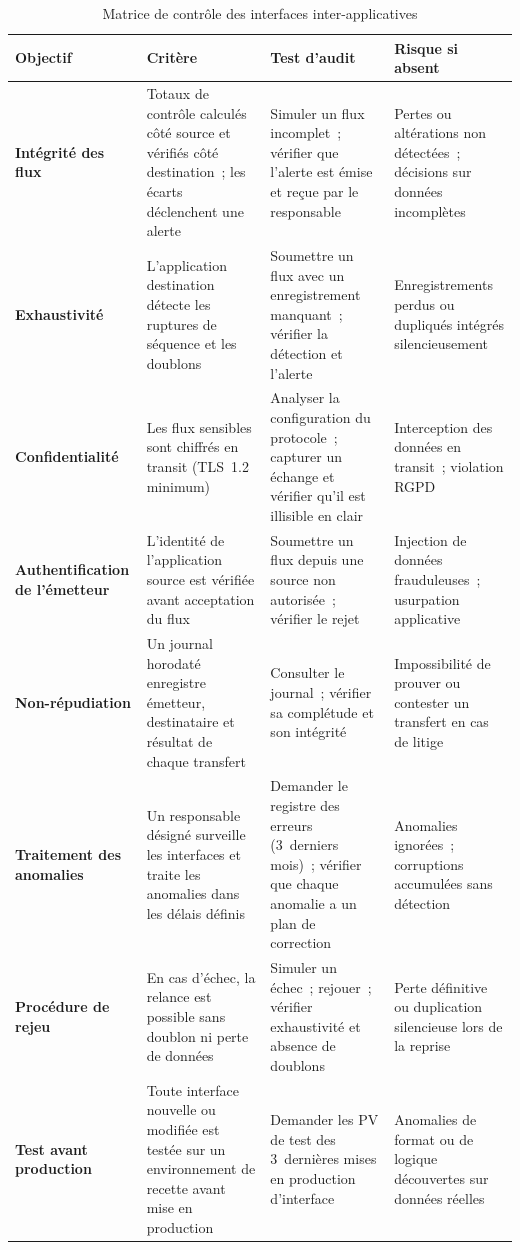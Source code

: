 \begin{table}[H]
\centering
\small
\renewcommand{\arraystretch}{1.5}
\caption{Matrice de contrôle des interfaces inter-applicatives}
\label{tab:controles-interfaces}
\begin{tabular}{|p{2.6cm}|p{3.8cm}|p{3.8cm}|p{2.5cm}|}
    \hline
    \rowcolor{gray!20}
    \textbf{Objectif} & \textbf{Critère} & \textbf{Test d'audit} &
    \textbf{Risque si absent} \\ \hline
    \textbf{Intégrité des flux} &
    Totaux de contrôle calculés côté source et vérifiés côté destination~;
    les écarts déclenchent une alerte &
    Simuler un flux incomplet~; vérifier que l'alerte est émise et reçue
    par le responsable &
    Pertes ou altérations non détectées~; décisions sur données
    incomplètes \\ \hline
    \textbf{Exhaustivité} &
    L'application destination détecte les ruptures de séquence et les
    doublons &
    Soumettre un flux avec un enregistrement manquant~; vérifier la
    détection et l'alerte &
    Enregistrements perdus ou dupliqués intégrés silencieusement \\ \hline
    \textbf{Confidentialité} &
    Les flux sensibles sont chiffrés en transit (TLS~1.2 minimum) &
    Analyser la configuration du protocole~; capturer un échange et
    vérifier qu'il est illisible en clair &
    Interception des données en transit~; violation RGPD \\ \hline
    \textbf{Authentification de l'émetteur} &
    L'identité de l'application source est vérifiée avant acceptation
    du flux &
    Soumettre un flux depuis une source non autorisée~; vérifier le
    rejet &
    Injection de données frauduleuses~; usurpation applicative \\ \hline
    \textbf{Non-répudiation} &
    Un journal horodaté enregistre émetteur, destinataire et résultat
    de chaque transfert &
    Consulter le journal~; vérifier sa complétude et son intégrité &
    Impossibilité de prouver ou contester un transfert en cas de litige
    \\ \hline
    \textbf{Traitement des anomalies} &
    Un responsable désigné surveille les interfaces et traite les
    anomalies dans les délais définis &
    Demander le registre des erreurs (3~derniers mois)~; vérifier que
    chaque anomalie a un plan de correction &
    Anomalies ignorées~; corruptions accumulées sans détection \\ \hline
    \textbf{Procédure de rejeu} &
    En cas d'échec, la relance est possible sans doublon ni perte de
    données &
    Simuler un échec~; rejouer~; vérifier exhaustivité et absence de
    doublons &
    Perte définitive ou duplication silencieuse lors de la reprise \\ \hline
    \textbf{Test avant production} &
    Toute interface nouvelle ou modifiée est testée sur un environnement
    de recette avant mise en production &
    Demander les PV de test des 3~dernières mises en production
    d'interface &
    Anomalies de format ou de logique découvertes sur données réelles
    \\ \hline
\end{tabular}
\end{table}


